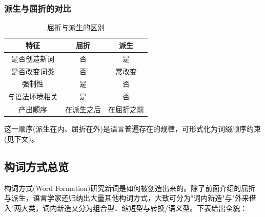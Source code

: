 \subsubsection{派生与屈折的对比}

\begin{table}[H]
\centering
\caption{屈折与派生的区别}
\begin{tabulary}{\textwidth}{@{}CCC@{}}
\toprule
\textbf{特征} & \textbf{屈折} & \textbf{派生} \\
\midrule
是否创造新词 & 否 & 是 \\
是否改变词类 & 否 & 常改变 \\
强制性 & 是 & 否 \\
与语法环境相关 & 是 & 否 \\
产出顺序 & 在派生之后 & 在屈折之前 \\
\bottomrule
\end{tabulary}
\end{table}

这一顺序(派生在内、屈折在外)是语言普遍存在的规律，可形式化为词缀顺序约束(见下文)。

\subsection{构词方式总览}

构词方式(Word Formation)研究新词是如何被创造出来的。除了前面介绍的屈折与派生，语言学家还归纳出大量其他构词方式，大致可分为"词内新造"与"外来借入"两大类，词内新造又分为组合型、缩短型与转换/语义型。下表给出全貌：

